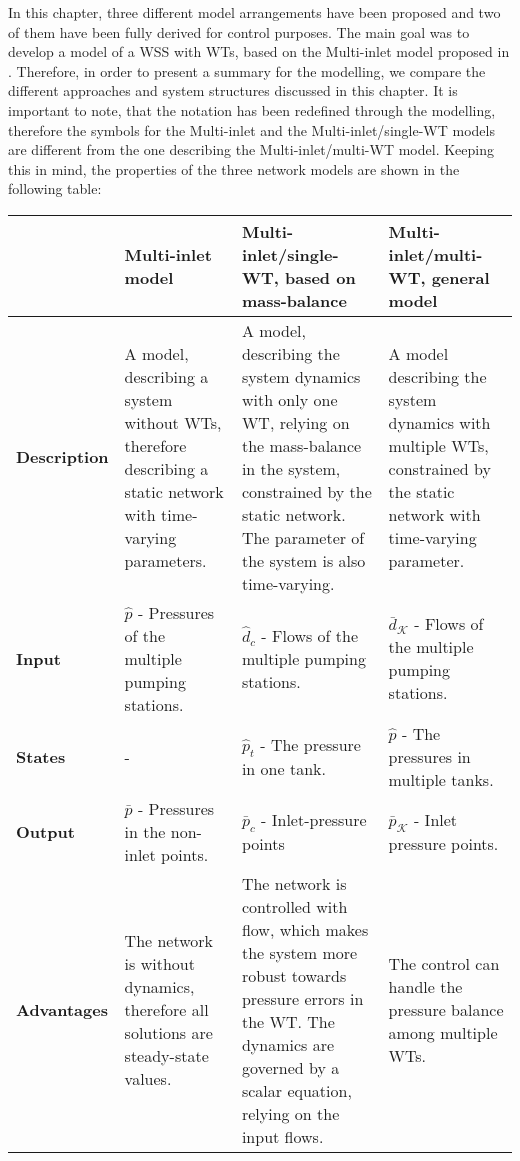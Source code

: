 In this chapter, three different model arrangements have been proposed and two of them have been fully derived for control purposes. The main goal was to develop a model of a WSS with WTs, based on the Multi-inlet model proposed in \cite{oneinput_paper}. Therefore, in order to present a summary for the modelling, we compare the different approaches and system structures discussed in this chapter. It is important to note, that the notation has been redefined through the modelling, therefore the symbols for the Multi-inlet and the Multi-inlet/single-WT models are different from the one describing the Multi-inlet/multi-WT model. Keeping this in mind, the properties of the three network models are shown in the following table:
\vspace{-2mm}
\begin{center}
    \begin{tabular}{ | >{\centering\arraybackslash}m{1.8cm} | >{\centering\arraybackslash}m{3.6cm} | >{\centering\arraybackslash}m{3.6cm} | >{\centering\arraybackslash}m{3.6cm} |}
    \hline
    \multirow{1}{*}
     & \textbf{Multi-inlet model} & \textbf{Multi-inlet/single-WT, based on mass-balance} & \textbf{Multi-inlet/multi-WT, general model} \\ 
     \hline
     \multirow{1}{*}
    \textbf{Description} & A model, describing a system without WTs, therefore describing a static network with time-varying parameters. & A model, describing the system dynamics with only one WT, relying on the mass-balance in the system, constrained by the static network. The parameter of the system is also time-varying. & A model describing the system dynamics with multiple WTs, constrained by the static network with time-varying parameter.\\ 
    \hline
      \multirow{1}{*}
    \textbf{Input} & $\hat{p}$ - Pressures of the multiple pumping stations. & $\hat{d}_c$ - Flows of the multiple pumping stations. & $\bar{d}_{\mathcal{K}}$ - Flows of the multiple pumping stations.\\ 
    \hline
      \multirow{1}{*}
    \textbf{States} & - & $\hat{p}_t$ - The pressure in one tank. & $\hat{p}$ - The pressures in multiple tanks.\\ 
    \hline
      \multirow{1}{*}
    \textbf{Output} & $\bar{p}$ - Pressures in the non-inlet points. & $\bar{p}_{c}$ - Inlet-pressure points & $\bar{p}_{\mathcal{K}}$ - Inlet pressure points.\\ 
    \hline
      \multirow{1}{*}
    \textbf{Advantages} & The network is without dynamics, therefore all solutions are steady-state values. & The network is controlled with flow, which makes the system more robust towards pressure errors in the WT. The dynamics are governed by a scalar equation, relying on the input flows.  & The control can handle the pressure balance among multiple WTs.\\ 

\end{tabular}
\end{center}
